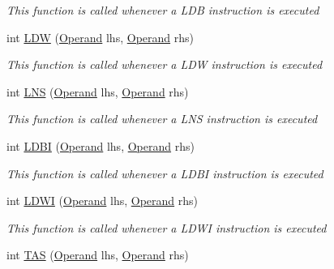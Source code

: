 \begin{DoxyCompactItemize}
\begin{DoxyCompactList}\small\item\em This function is called whenever a L\+D\+B instruction is executed \end{DoxyCompactList}\item 
int \hyperlink{class_c_p_u___o_s___simulator_1_1_c_p_u_1_1_instruction_adc1b564050331c46094af907abb34acb}{L\+D\+W} (\hyperlink{class_c_p_u___o_s___simulator_1_1_c_p_u_1_1_operand}{Operand} lhs, \hyperlink{class_c_p_u___o_s___simulator_1_1_c_p_u_1_1_operand}{Operand} rhs)
\begin{DoxyCompactList}\small\item\em This function is called whenever a L\+D\+W instruction is executed \end{DoxyCompactList}\item 
int \hyperlink{class_c_p_u___o_s___simulator_1_1_c_p_u_1_1_instruction_abaa66d00b38349cd8033c8c1428a9ca3}{L\+N\+S} (\hyperlink{class_c_p_u___o_s___simulator_1_1_c_p_u_1_1_operand}{Operand} lhs, \hyperlink{class_c_p_u___o_s___simulator_1_1_c_p_u_1_1_operand}{Operand} rhs)
\begin{DoxyCompactList}\small\item\em This function is called whenever a L\+N\+S instruction is executed \end{DoxyCompactList}\item 
int \hyperlink{class_c_p_u___o_s___simulator_1_1_c_p_u_1_1_instruction_a41d94be59f02b4ff381bed811f0c4f2e}{L\+D\+B\+I} (\hyperlink{class_c_p_u___o_s___simulator_1_1_c_p_u_1_1_operand}{Operand} lhs, \hyperlink{class_c_p_u___o_s___simulator_1_1_c_p_u_1_1_operand}{Operand} rhs)
\begin{DoxyCompactList}\small\item\em This function is called whenever a L\+D\+B\+I instruction is executed \end{DoxyCompactList}\item 
int \hyperlink{class_c_p_u___o_s___simulator_1_1_c_p_u_1_1_instruction_a2a8c6cf1d6f14e9d219fabc5957cd586}{L\+D\+W\+I} (\hyperlink{class_c_p_u___o_s___simulator_1_1_c_p_u_1_1_operand}{Operand} lhs, \hyperlink{class_c_p_u___o_s___simulator_1_1_c_p_u_1_1_operand}{Operand} rhs)
\begin{DoxyCompactList}\small\item\em This function is called whenever a L\+D\+W\+I instruction is executed \end{DoxyCompactList}\item 
int \hyperlink{class_c_p_u___o_s___simulator_1_1_c_p_u_1_1_instruction_a78fbef41ec65046f35456e7cb161d037}{T\+A\+S} (\hyperlink{class_c_p_u___o_s___simulator_1_1_c_p_u_1_1_operand}{Operand} lhs, \hyperlink{class_c_p_u___o_s___simulator_1_1_c_p_u_1_1_operand}{Operand} rhs)

\end{DoxyCompactItemize}
